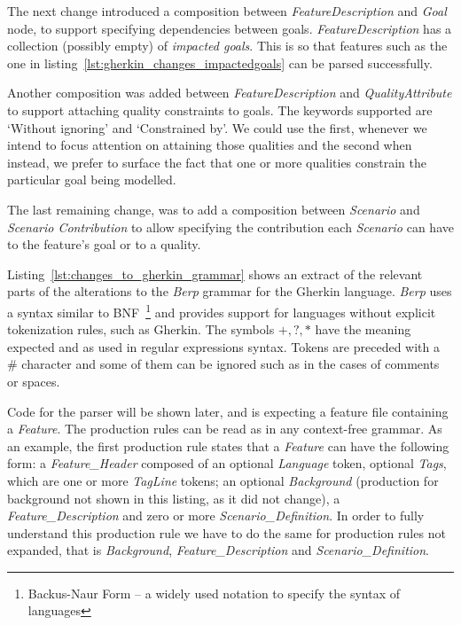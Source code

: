\documentclass[dissertation,final]{softeng}
\begin{document}
The next change introduced a composition between \emph{FeatureDescription} and \emph{Goal} node, to support specifying dependencies between goals. \emph{FeatureDescription} has a collection (possibly empty) of \emph{impacted goals}. This is so that features such as the one in listing~\ref{lst:gherkin_changes_impactedgoals} can be parsed successfully.

Another composition was added between \emph{FeatureDescription} and \emph{QualityAttribute} to support attaching quality constraints to goals. The keywords supported are `Without ignoring' and `Constrained by'. We could use the first, whenever we intend to focus attention on attaining those qualities and the second when instead, we prefer to surface the fact that one or more qualities constrain the particular goal being modelled.

The last remaining change, was to add a composition between \emph{Scenario} and \emph{Scenario Contribution} to allow specifying the contribution each \emph{Scenario} can have to the feature's goal or to a quality.

Listing~\ref{lst:changes_to_gherkin_grammar} shows an extract of the relevant parts of the alterations to the \emph{Berp} grammar for the Gherkin language. \emph{Berp} uses a syntax similar to BNF~\footnote{Backus-Naur Form --  a widely used notation to specify the syntax of languages} and provides support for languages without explicit tokenization rules, such as Gherkin. The symbols $+,?,*$ have the meaning expected and as used in regular expressions syntax. Tokens are preceded with a \# character and some of them can be ignored such as in the cases of comments or spaces.

Code for the parser will be shown later, and is expecting a feature file containing a \emph{Feature}. The production rules can be read as in any context-free grammar. As an example, the first production rule states that a \emph{Feature} can have the following form: a \emph{Feature\_Header} composed of an optional \emph{Language} token, optional \emph{Tags}, which are one or more \emph{TagLine} tokens; an optional \emph{Background} (production for background not shown in this listing, as it did not change), a \emph{Feature\_Description} and zero or more \emph{Scenario\_Definition}. In order to fully understand this production rule we have to do the same for production rules not expanded, that is \emph{Background}, \emph{Feature\_Description} and \emph{Scenario\_Definition}.
\end{document}

